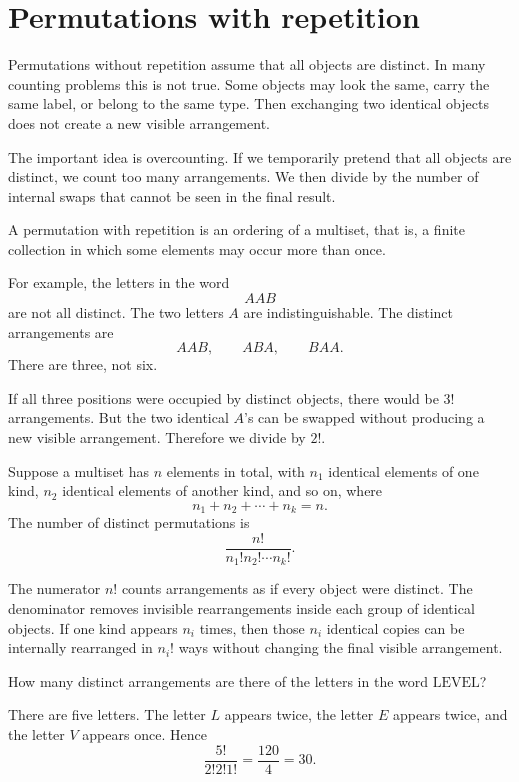 \section{Permutations with repetition}

Permutations without repetition assume that all objects are distinct. In many counting problems this is not true. Some objects may look the same, carry the same label, or belong to the same type. Then exchanging two identical objects does not create a new visible arrangement.

The important idea is overcounting. If we temporarily pretend that all objects are distinct, we count too many arrangements. We then divide by the number of internal swaps that cannot be seen in the final result.

\begin{definitionbox}
A permutation with repetition is an ordering of a multiset, that is, a finite collection in which some elements may occur more than once.
\end{definitionbox}

For example, the letters in the word
\[
AAB
\]
are not all distinct. The two letters \(A\) are indistinguishable. The distinct arrangements are
\[
AAB,\qquad ABA,\qquad BAA.
\]
There are three, not six.

If all three positions were occupied by distinct objects, there would be \(3!\) arrangements. But the two identical \(A\)'s can be swapped without producing a new visible arrangement. Therefore we divide by \(2!\).

\begin{theorembox}
Suppose a multiset has \(n\) elements in total, with \(n_1\) identical elements of one kind, \(n_2\) identical elements of another kind, and so on, where
\[
n_1+n_2+\cdots+n_k=n.
\]
The number of distinct permutations is
\[
\frac{n!}{n_1!n_2!\cdots n_k!}.
\]
\end{theorembox}

The numerator \(n!\) counts arrangements as if every object were distinct. The denominator removes invisible rearrangements inside each group of identical objects. If one kind appears \(n_i\) times, then those \(n_i\) identical copies can be internally rearranged in \(n_i!\) ways without changing the final visible arrangement.

\begin{examplebox}
How many distinct arrangements are there of the letters in the word \(\text{LEVEL}\)?

There are five letters. The letter \(L\) appears twice, the letter \(E\) appears twice, and the letter \(V\) appears once. Hence
\[
\frac{5!}{2!2!1!}=\frac{120}{4}=30.
\]
\end{examplebox}

